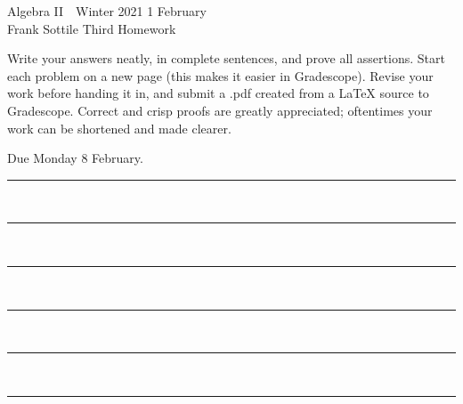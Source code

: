 \documentclass[12pt]{article}
\newcommand{\barsl}{\noindent\begin{minipage}[t]{575pt}
{\color{violet}\rule{575pt}{1.2pt}}\vspace{-5.7mm}\\
{\color{blue}\rule{575pt}{1.2pt}}\vspace{-5.7mm}\\
{\color{green}\rule{575pt}{1.2pt}}\vspace{-5.7mm}\\
{\color{yellow}\rule{575pt}{1.2pt}}\vspace{-5.7mm}\\
{\color{orange}\rule{575pt}{1.2pt}}\vspace{-5.7mm}\\
{\color{red}\rule{575pt}{1.2pt}}
\end{minipage}}
\begin{document}
\LARGE 
\noindent
Algebra II\ \ Winter 2021 \hfill 1 February\makebox[40pt][l]{\ }\\
Frank Sottile \hfill
\Large\sf
Third Homework\makebox[40pt][l]{\ }\\
\normalsize

\noindent
Write your answers neatly, in complete sentences, and prove all assertions.
Start each problem on a new page (this makes it easier in Gradescope).
Revise your work before handing it in, and submit a .pdf  created from a LaTeX source to Gradescope.
Correct and crisp proofs are greatly appreciated; oftentimes your work can be shortened and made clearer.

{\color{red}Due Monday 8 February.}\vspace{-5pt}\newline

\barsl
\end{document}
